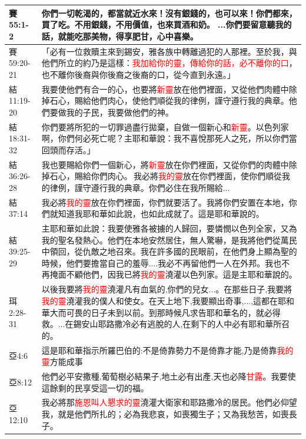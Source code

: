 \begin{table}[H]
\begin{tabular}{p{4em}|p{44em}}
賽55:1-2&你們一切乾渴的，都當就近水來！沒有銀錢的，也可以來！你們都來，買了吃。不用銀錢，不用價值，也來買酒和奶。 ...你們要留意聽我的話，就能吃那美物，得享肥甘，心中喜樂。\\  \midrule

賽59:20-21&「必有一位救贖主來到錫安，雅各族中轉離過犯的人那裡。至於我，與他們所立的約乃是這樣：\textcolor{red}{我加給你的靈，傳給你的話，必不離你的口}，也不離你後裔與你後裔之後裔的口，從今直到永遠。」\\  \midrule

結11:19-20&我要使他們有合一的心，也要將\textcolor{red}{新靈}放在他們裡面，又從他們肉體中除掉石心，賜給他們肉心，使他們順從我的律例，謹守遵行我的典章。他們要做我的子民，我要做他們的神。\\  \midrule

結18:31-32&你們要將所犯的一切罪過盡行拋棄，自做一個新心和\textcolor{red}{新靈}。以色列家啊，你們何必死亡呢？主耶和華說：我不喜悅那死人之死，所以你們當回頭而存活。」\\  \midrule
結36:26-28&我也要賜給你們一個新心，將\textcolor{red}{新靈}放在你們裡面，又從你們的肉體中除掉石心，賜給你們肉心。 我必將\textcolor{red}{我的靈}放在你們裡面，使你們順從我的律例，謹守遵行我的典章。你們必住在我所賜給...\\  \midrule
結37:14&我必將\textcolor{red}{我的靈}放在你們裡面，你們就要活了。我將你們安置在本地，你們就知道我耶和華如此說，也如此成就了。這是耶和華說的。\\  \midrule

結39:25-29&主耶和華如此說：我要使雅各被擄的人歸回，要憐憫以色列全家，又為我的聖名發熱心。他們在本地安然居住，無人驚嚇，是我將他們從萬民中領回，從仇敵之地召來。我在許多國的民眼前，在他們身上顯為聖的時候，他們要擔當自己的羞辱....我必不再留他們一人在外邦。我也不再掩面不顧他們，因我已將\textcolor{red}{我的靈}澆灌以色列家。這是主耶和華說的。\\  \midrule
珥2:28-31&以後我要將\textcolor{red}{我的靈}澆灌凡有血氣的,你們的兒女...。在那些日子,我要將\textcolor{red}{我的靈}澆灌我的僕人和使女。在天上地下,我要顯出奇事,...,這都在耶和華大而可畏的日子未到以前。到那時候凡求告耶和華名的，就必得救。...在錫安山耶路撒冷必有逃脫的人,在剩下的人中必有耶和華所召的。\\  \midrule

亞4:6&這是耶和華指示所羅巴伯的:不是倚靠勢力不是倚靠才能,乃是倚靠\textcolor{red}{我的靈}方能成事\\  \midrule
亞8:12&他們必平安撒種,葡萄樹必結果子,地土必有出產,天也必降\textcolor{red}{甘露}。我要使這餘剩的民享受這一切的福。\\  \midrule

亞12:10&我必將那\textcolor{red}{施恩叫人懇求的靈}澆灌大衛家和耶路撒冷的居民。他們必仰望我，就是他們所扎的；必為我悲哀，如喪獨生子；又為我愁苦，如喪長子。\\ \midrule 

\end{tabular}%
\end{table}



